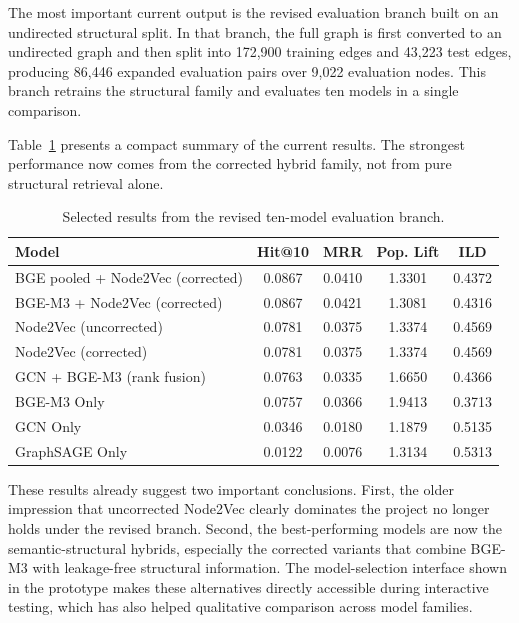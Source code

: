 The most important current output is the revised evaluation branch built on an
undirected structural split. In that branch, the full graph is first converted
to an undirected graph and then split into 172,900 training edges and 43,223
test edges, producing 86,446 expanded evaluation pairs over 9,022 evaluation
nodes. This branch retrains the structural family and evaluates ten models in a
single comparison.

Table~\ref{tab:selected-results} presents a compact summary of the current
results. The strongest performance now comes from the corrected hybrid family,
not from pure structural retrieval alone.

\begin{table}[H]
\centering
\caption{Selected results from the revised ten-model evaluation branch.}
\label{tab:selected-results}
\begin{tabular}{p{}cccc}
\toprule
\textbf{Model} & \textbf{Hit@10} & \textbf{MRR} & \textbf{Pop. Lift} & \textbf{ILD} \\
\midrule
BGE pooled + Node2Vec (corrected) & 0.0867 & 0.0410 & 1.3301 & 0.4372 \\
BGE-M3 + Node2Vec (corrected) & 0.0867 & 0.0421 & 1.3081 & 0.4316 \\
Node2Vec (uncorrected) & 0.0781 & 0.0375 & 1.3374 & 0.4569 \\
Node2Vec (corrected) & 0.0781 & 0.0375 & 1.3374 & 0.4569 \\
GCN + BGE-M3 (rank fusion) & 0.0763 & 0.0335 & 1.6650 & 0.4366 \\
BGE-M3 Only & 0.0757 & 0.0366 & 1.9413 & 0.3713 \\
GCN Only & 0.0346 & 0.0180 & 1.1879 & 0.5135 \\
GraphSAGE Only & 0.0122 & 0.0076 & 1.3134 & 0.5313 \\
\bottomrule
\end{tabular}
\end{table}

These results already suggest two important conclusions. First, the older
impression that uncorrected Node2Vec clearly dominates the project no longer
holds under the revised branch. Second, the best-performing models are now the
semantic-structural hybrids, especially the corrected variants that combine
BGE-M3 with leakage-free structural information. The model-selection interface
shown in the prototype makes these alternatives directly accessible during
interactive testing, which has also helped qualitative comparison across model
families.
